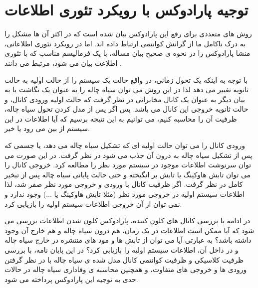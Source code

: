 \section{توجیه پارادوکس با رویکرد تئوری اطلاعات}
روش های متعددی برای رفع این پارادوکس بیان شده است که در اکثر آن ها مشکل را به درک ناکامل ما از گرانش کوانتمی ارتباط داده اند. اما در رویکرد تئوری اطلاعاتی، منشا پارادوکس را در نحوه ی صحیح بیان مساله، با یک فرمالیسم مناسب که با تئوری اطلاعت بیان می شود، مرتبط می دانند
\cite{cit, qit}.

با توجه به اینکه یک تحول زمانی، در واقع حالت یک سیستم را از حالت اولیه به حالت ثانویه تغییر می دهد لذا در این روش می توان سیاه چاله را به عنوان یک نگاشت یا به بیان دیگر به عنوان یک کانال مخابراتی در نظر گرفت که حالت اولیه ورودی کانال، و حالت ثانویه خروجی این کانال می باشد. پس اگر پس از مدل کردن تحول سیاه چاله، ظرفیت آن را محاسبه کنیم، می توانیم به این نتیجه برسیم که آیا اطلاعات در این سیستم از بین می رود یا خیر.

ورودی کانال را می توان حالت اولیه ای که تشکیل سیاه چاله می دهد، یا جسمی که پس از تشکیل سیاه چاله به درون آن جذب می شود در نظر گرفت. در این صورت می توان سرنوشت اطلاعات موجود در سیستم مورد نظر را مطالعه کرد. خروجی کانال را می توان تابش هاوکینگ یا تابش بر انگیخته و حتی حالت پایانی سیاه چاله پس از تبخیر کامل در نظر گرفت. اگر ظرفیت کانال با ورودی و خروجی مورد نظر صفر شد، لذا اطلاعات سیستم اولیه در خروجی مورد نظر (مثلا تابش هاوکینگ یا ...) وجود ندارد و نمی توان از آن خروجی اطلاعات سیستم اولیه را بازیابی کرد.

در ادامه با بررسی کانال های کلون کننده، پارادوکس کلون شدن اطلاعات بررسی می شود که آیا ممکن است اطلاعات در یک زمان، هم درون سیاه چاله و هم خارج آن وجود داشته باشد؟ به عبارتی آیا می توان از تابش ها و مود های منتشره در خارج سیاه چاله و در داخل آن، اطلاعات سیستم اولیه را بازیابی کرد؟ در این پایان نامه، با بررسی ظرفیت  کلاسیکی و ظرفیت کوانتمی کانال مدل شده ی سیاه چاله با در نظر گرفتن ورودی ها و خروجی های متفاوت، و همچنین محاسبه ی وفاداری سیاه چاله در حالات حدی به  توجیه این پارادوکس پرداخته می شود. 